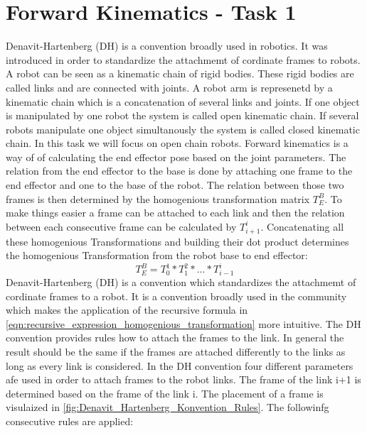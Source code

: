 \documentclass{tpk4170report}
\begin{document}
\chapter{Forward Kinematics - Task 1}
Denavit-Hartenberg (DH) is a convention broadly used in robotics. It was introduced in order to standardize the attachmemt of cordinate frames to robots. A robot can be seen as a kinematic chain of rigid bodies. These rigid bodies are called links and are connected with joints. A robot arm is represenetd by a kinematic chain which is a concatenation of several links and joints. If one object is manipulated by one robot the system is called open kinematic chain. If several robots manipulate one object simultanously the system is called closed kinematic chain. In this task we will focus on open chain robots. Forward kinematics is a way of of calculating the end effector pose based on the joint parameters. The relation from the end effector to the base is done by attaching one frame to the end effector and one to the base of the robot. The relation between those two frames is then determined by the homogenious transformation matrix \(T_{E}^{B}\). To make things easier a frame can be attached to each link and then the relation between each consecutive frame can be calculated by \(T_{i+1}^{i}\). Concatenating all these homogenious Transformations and building their dot product determines the homogenious Transformation from the robot base to end effector: 
\begin{equation}
  T_{E}^{B} = T_{0}^{1}*T_{1}^{2}* ... *T_{i-1}^{i}
  \label{eqn:recursive_expression_homogenious_transformation}
\end{equation}
Denavit-Hartenberg (DH) is a convention which standardizes the attachmemt of cordinate frames to a robot. It is a convention broadly used in the community which makes the application of the recursive formula in \ref{eqn:recursive_expression_homogenious_transformation} more intuitive. The DH convention provides rules how to attach the frames to the link. In general the result should be the same if the frames are attached differently to the links as long as every link is considered. In the DH convention four different parameters afe used in order to attach frames to the robot links. The frame of the link i+1 is determined based on the frame of the link i. The placement of a frame is visulaized in \ref{fig:Denavit_Hartenberg_Konvention_Rules}. The followinfg consecutive rules are applied:
\end{document}
